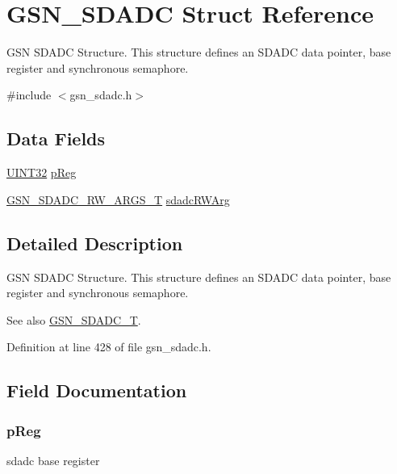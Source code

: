 \hypertarget{a00212}{
\section{GSN\_\-SDADC Struct Reference}
\label{a00212}
}


GSN SDADC Structure. This structure defines an SDADC data pointer, base register and synchronous semaphore.  




{\ttfamily \#include $<$gsn\_\-sdadc.h$>$}

\subsection*{Data Fields}
\begin{DoxyCompactItemize}
\item 
\hyperlink{a00660_gae1e6edbbc26d6fbc71a90190d0266018}{UINT32} \hyperlink{a00212_a733fb7afbc3bd37a546de0e37c12f150}{pReg}
\item 
\hyperlink{a00215}{GSN\_\-SDADC\_\-RW\_\-ARGS\_\-T} \hyperlink{a00212_a425dd6f43085c4346c99f9454f569dbf}{sdadcRWArg}
\end{DoxyCompactItemize}


\subsection{Detailed Description}
GSN SDADC Structure. This structure defines an SDADC data pointer, base register and synchronous semaphore. 

\begin{DoxySeeAlso}{See also}
\hyperlink{a00652_ga24812a09f6831a451bf951bbc956b2b9}{GSN\_\-SDADC\_\-T}. 
\end{DoxySeeAlso}


Definition at line 428 of file gsn\_\-sdadc.h.



\subsection{Field Documentation}
\hypertarget{a00212_a733fb7afbc3bd37a546de0e37c12f150}{
\subsubsection[{pReg}]{ {\bf pReg}}}
\label{a00212_a733fb7afbc3bd37a546de0e37c12f150}
sdadc base register 

